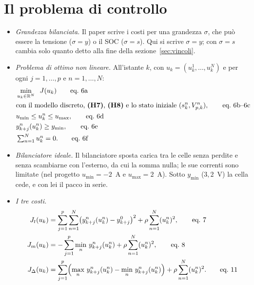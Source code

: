 \documentclass[11pt,a4paper]{article}
\newcommand{\ip}[1]{\textbf{(H#1)}}         %
\begin{document}
\section{Il problema di controllo}\label{sec:problema}

\begin{itemize}
  \item \emph{Grandezza bilanciata.} Il paper scrive i costi per una grandezza
        $\sigma$, che può essere la tensione ($\sigma = y$) o il SOC
        ($\sigma = s$). Qui si scrive $\sigma = y$; con $\sigma = s$ cambia
        solo quanto detto alla fine della sezione~\ref{sec:vincoli}.
  \item \emph{Problema di ottimo non lineare.} All'istante $k$, con
        $u_k = (u^1_k, \dots, u^N_k)$ e per ogni $j = 1, \dots, p$ e
        $n = 1, \dots, N$:
        \begin{align*}
          & \min_{u_k \in \mathbb{R}^N} \;\; J(u_k) \tag*{eq.~6a}\\
          & \text{con il modello discreto, \ip{7}, \ip{8} e lo stato iniziale }
            (s^n_k, V^n_{p,k}) , \tag*{eq.~6b--6c}\\
          & u_{\min} \le u^n_k \le u_{\max} , \tag*{eq.~6d}\\
          & y^n_{k+j}(u^n_k) \ge y_{\min} , \tag*{eq.~6e}\\
          & \textstyle\sum_{n=1}^{N} u^n_k = 0 . \tag*{eq.~6f}
        \end{align*}
  \item[\ip{9}] \emph{Bilanciatore ideale.} Il bilanciatore sposta carica tra
        le celle senza perdite e senza scambiarne con l'esterno, da cui la
        somma nulla; le sue correnti sono limitate (nel progetto
        $u_{\min} = -2$~A e $u_{\max} = 2$~A). Sotto $y_{\min}$ ($3{,}2$~V)
        la cella cede, e con lei il pacco in serie.
  \item \emph{I tre costi.}
        \begin{align*}
          J_t(u_k) &= \sum_{j=1}^{p}\sum_{n=1}^{N}
                      \bigl(y^n_{k+j}(u^n_k) - y^0_{k+j}\bigr)^2
                      + \rho \sum_{n=1}^{N} (u^n_k)^2 , \tag*{eq.~7}\\
          J_m(u_k) &= -\sum_{j=1}^{p} \min_n\, y^n_{k+j}(u^n_k)
                      + \rho \sum_{n=1}^{N} (u^n_k)^2 , \tag*{eq.~8}\\
          J_\Delta(u_k) &= \sum_{j=1}^{p} \Bigl(\max_n\, y^n_{k+j}(u^n_k)
                      - \min_n\, y^n_{k+j}(u^n_k)\Bigr)
                      + \rho \sum_{n=1}^{N} (u^n_k)^2 . \tag*{eq.~11}

\end{align*}
\end{itemize}
\end{document}
